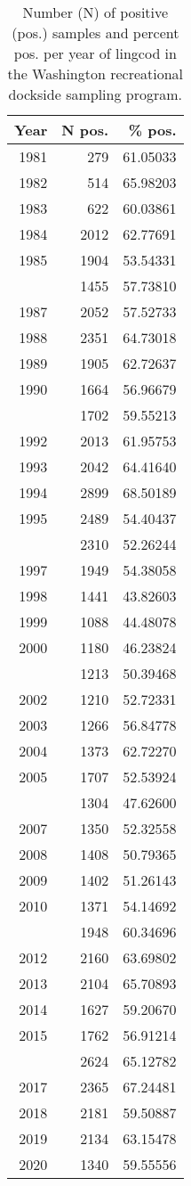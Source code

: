 
\begin{longtable}[t]{rrr}
\caption{\label{tab:reccpuewa-n}Number (N) of positive (pos.) samples and percent pos. per year of lingcod in the Washington recreational dockside sampling program.}\\
\toprule
Year & N pos. & \% pos.\\
\midrule
1981 & 279 & 61.05033\\
1982 & 514 & 65.98203\\
1983 & 622 & 60.03861\\
1984 & 2012 & 62.77691\\
1985 & 1904 & 53.54331\\
\addlinespace
1986 & 1455 & 57.73810\\
1987 & 2052 & 57.52733\\
1988 & 2351 & 64.73018\\
1989 & 1905 & 62.72637\\
1990 & 1664 & 56.96679\\
\addlinespace
1991 & 1702 & 59.55213\\
1992 & 2013 & 61.95753\\
1993 & 2042 & 64.41640\\
1994 & 2899 & 68.50189\\
1995 & 2489 & 54.40437\\
\addlinespace
1996 & 2310 & 52.26244\\
1997 & 1949 & 54.38058\\
1998 & 1441 & 43.82603\\
1999 & 1088 & 44.48078\\
2000 & 1180 & 46.23824\\
\addlinespace
2001 & 1213 & 50.39468\\
2002 & 1210 & 52.72331\\
2003 & 1266 & 56.84778\\
2004 & 1373 & 62.72270\\
2005 & 1707 & 52.53924\\
\addlinespace
2006 & 1304 & 47.62600\\
2007 & 1350 & 52.32558\\
2008 & 1408 & 50.79365\\
2009 & 1402 & 51.26143\\
2010 & 1371 & 54.14692\\
\addlinespace
2011 & 1948 & 60.34696\\
2012 & 2160 & 63.69802\\
2013 & 2104 & 65.70893\\
2014 & 1627 & 59.20670\\
2015 & 1762 & 56.91214\\
\addlinespace
2016 & 2624 & 65.12782\\
2017 & 2365 & 67.24481\\
2018 & 2181 & 59.50887\\
2019 & 2134 & 63.15478\\
2020 & 1340 & 59.55556\\
\bottomrule
\end{longtable}
